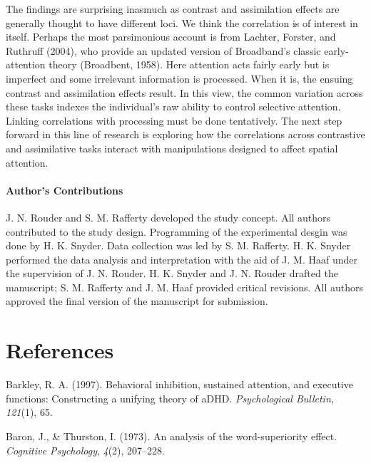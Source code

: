 \documentclass[english,floatsintext,man]{apa6}
\newcounter{author}
\begin{document}
The findings are surprising inasmuch as contrast and assimilation
effects are generally thought to have different loci. We think the
correlation is of interest in itself. Perhaps the most parsimonious
account is from Lachter, Forster, and Ruthruff (2004), who provide an
updated version of Broadband's classic early-attention theory
(Broadbent, 1958). Here attention acts fairly early but is imperfect and
some irrelevant information is processed. When it is, the ensuing
contrast and assimilation effects result. In this view, the common
variation across these tasks indexes the individual's raw ability to
control selective attention. Linking correlations with processing must
be done tentatively. The next step forward in this line of research is
exploring how the correlations across contrastive and assimilative tasks
interact with manipulations designed to affect spatial attention.

\paragraph{Author's Contributions}\label{authors-contributions}

J. N. Rouder and S. M. Rafferty developed the study concept. All authors
contributed to the study design. Programming of the experimental desgin
was done by H. K. Snyder. Data collection was led by S. M. Rafferty. H.
K. Snyder performed the data analysis and interpretation with the aid of
J. M. Haaf under the supervision of J. N. Rouder. H. K. Snyder and J. N.
Rouder drafted the manuscript; S. M. Rafferty and J. M. Haaf provided
critical revisions. All authors approved the final version of the
manuscript for submission.

\newpage

\section{References}\label{references}

\setlength{\parindent}{-0.5in} \setlength{\leftskip}{0.5in}

\hypertarget{refs}{}
\hypertarget{ref-Barkley:1997}{}
Barkley, R. A. (1997). Behavioral inhibition, sustained attention, and
executive functions: Constructing a unifying theory of aDHD.
\emph{Psychological Bulletin}, \emph{121}(1), 65.

\hypertarget{ref-Baron:Thurston:1973}{}
Baron, J., \& Thurston, I. (1973). An analysis of the word-superiority
effect. \emph{Cognitive Psychology}, \emph{4}(2), 207--228.
\end{document}
